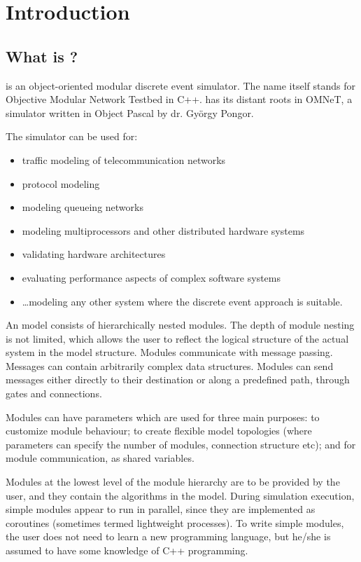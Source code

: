 \chapter{Introduction}
\label{cha:introduction}


\section{What is {\opp}?}

{\opp} is an object-oriented modular discrete event simulator.
The name itself stands for Objective Modular Network Testbed
in C++. {\opp} has its distant roots in OMNeT, a simulator written
in Object Pascal by dr. Gy\"{o}rgy Pongor.

The simulator can be used for:
\begin{itemize}
  \item{traffic modeling of telecommunication networks}
  \item{protocol modeling}
  \item{modeling queueing networks}
  \item{modeling multiprocessors and other distributed hardware systems}
  \item{validating hardware architectures}
  \item{evaluating performance aspects of complex software systems}
  \item{\dots modeling any other system where the discrete event approach is
    suitable.}
\end{itemize}


An {\opp} model consists of hierarchically nested modules. The
depth of module nesting is not limited, which allows the user
to reflect the logical structure of the actual system in the
model structure. Modules communicate with message passing. Messages
can contain arbitrarily complex data structures. Modules can
send messages either directly to their destination or along a
predefined path, through gates and connections.


Modules can have parameters which are used for three main purposes:
to customize module behaviour; to create flexible model topologies
(where parameters can specify the number of modules, connection
structure etc); and for module communication, as shared variables.

Modules at the lowest level of the module hierarchy are to be
provided by the user, and they contain the algorithms in the
model. During simulation execution, simple modules appear to
run in parallel, since they are implemented as coroutines (sometimes
termed lightweight processes). To write simple modules, the user
does not need to learn a new programming language, but he/she
is assumed to have some knowledge of C++ programming.

